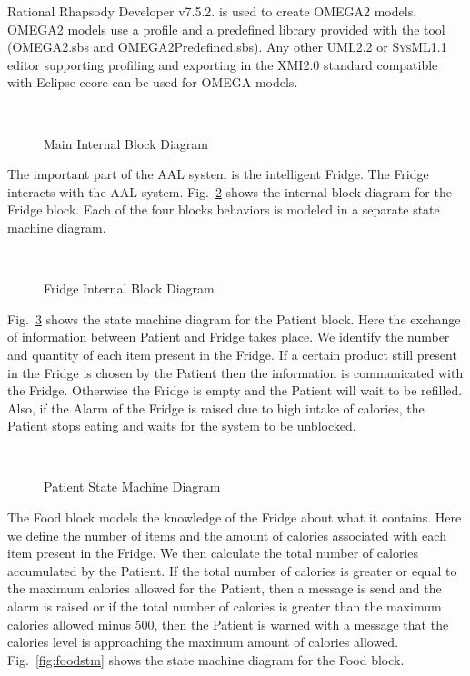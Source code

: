 \documentclass[a4paper,twoside]{article}
\def\sysml{\textsc{SysML}}
\def\uml{\textsc{UML}}
\begin{document}
Rational Rhapsody Developer v7.5.2. \cite{test16} is used to create OMEGA2 models. OMEGA2 models use a profile and a predefined library provided with the tool (OMEGA2.sbs and OMEGA2Predefined.sbs). Any other \uml{}2.2 or \sysml{}1.1 editor supporting profiling and exporting in the XMI2.0 standard compatible with Eclipse ecore can be used for OMEGA models.

\begin{figure}[!h]
  \vspace{8cm}~
  \centering
  {}
  \caption{Main Internal Block Diagram}
  \label{fig:mainibd}
 \end{figure}
 
The important part of the AAL system is the intelligent Fridge. The Fridge interacts with the AAL system. Fig.~\ref{fig:fridgeibd} shows the internal block diagram for the Fridge block. Each of the four blocks behaviors is modeled in a separate state machine diagram.

\begin{figure}[!h]
  \vspace{8cm}~
  \centering
  {}
  \caption{Fridge Internal Block Diagram}
  \label{fig:fridgeibd}
 \end{figure}
 
Fig.~\ref{fig:patientstm} shows the state machine diagram for the Patient block. Here the exchange of information between Patient and Fridge takes place. We identify the number and quantity of each item present in the Fridge. If a certain product still present in the Fridge is chosen by the Patient then the information is  communicated with the Fridge.  Otherwise the Fridge is empty and the Patient will wait to be refilled. Also, if the Alarm of the Fridge is raised due to  high intake of calories, the Patient stops eating and waits for the system to be unblocked.
 
\begin{figure}[!h]
  \vspace{8cm}~
  \centering
  {}
  \caption{Patient State Machine Diagram}
  \label{fig:patientstm}
 \end{figure}
 
The Food block models the knowledge of the Fridge about what it contains. Here we define the number of items and the amount of calories associated with each item present in the Fridge. We then calculate the total number of calories accumulated by the Patient. If the total number of calories is greater or equal to the maximum calories allowed for the Patient, then a message is send and the alarm is raised or if the total number of calories is greater than the maximum calories allowed minus 500, then the Patient is warned with a message that the calories level is approaching the maximum amount of calories allowed. Fig.~\ref{fig:foodstm} shows the state machine diagram for the Food block.
\end{document}
